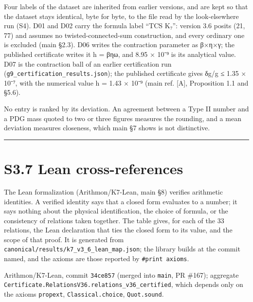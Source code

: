 \documentclass[11pt,a4paper]{article}
\begin{document}
Four labels of the dataset are inherited from earlier versions, and are kept so that the dataset stays identical, byte for byte, to the file read by the look-elsewhere run (S4). D01 and D02 carry the formula label ``TCS K₇'': version 3.6 posits (21, 77) and assumes no twisted-connected-sum construction, and every ordinary one is excluded (main §2.3). D06 writes the contraction parameter as β×η×γ; the published certificate writes it h = βηω, and 8.95 × 10⁻⁹ is its analytical value. D07 is the contraction ball of an earlier certification run (\texttt{g9\_\allowbreak{}certification\_\allowbreak{}results.\allowbreak{}json}); the published certificate gives δg/g ≤ 1.35 × 10⁻⁷, with the numerical value h = 1.43 × 10⁻⁹ (main ref. {[}A{]}, Proposition 1.1 and §5.6).

No entry is ranked by its deviation. An agreement between a Type II number and a PDG mass quoted to two or three figures measures the rounding, and a mean deviation measures closeness, which main §7 shows is not distinctive.

\begin{center}\rule{\linewidth}{0.5pt}\end{center}

\section{S3.7 Lean cross-references}\label{s3.7-lean-cross-references}

The Lean formalization (Arithmon/K7-Lean, main §8) verifies arithmetic identities. A verified identity says that a closed form evaluates to a number; it says nothing about the physical identification, the choice of formula, or the consistency of relations taken together. The table gives, for each of the 33 relations, the Lean declaration that ties the closed form to its value, and the scope of that proof. It is generated from \texttt{canonical/\allowbreak{}results/\allowbreak{}k7\_\allowbreak{}v3\_\allowbreak{}6\_\allowbreak{}lean\_\allowbreak{}map.\allowbreak{}json}; the library builds at the commit named, and the axioms are those reported by \texttt{\#print\ axioms}.

Arithmon/K7-Lean, commit \texttt{34ce857} (merged into \texttt{main}, PR \#167); aggregate \texttt{Certificate.\allowbreak{}Relations\allowbreak{}V36.\allowbreak{}relations\_\allowbreak{}v36\_\allowbreak{}certified}, which depends only on the axioms \texttt{propext}, \texttt{Classical.\allowbreak{}choice}, \texttt{Quot.\allowbreak{}sound}.
\end{document}
